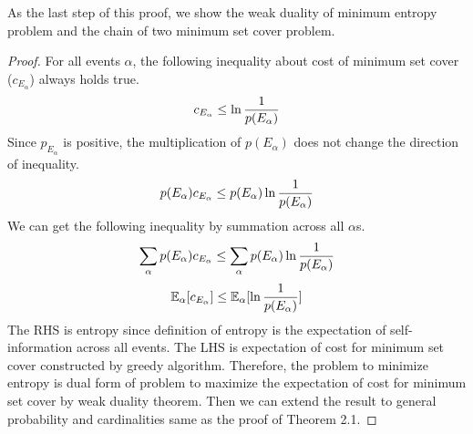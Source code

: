 As the last step of this proof, we show the weak duality of minimum entropy problem and the chain of 
two minimum set cover problem.

\begin{proof}
For all events $\alpha$, the following inequality about cost of minimum set cover 
($c_{E_\alpha}$) always holds true. 
\begin{equation}
\label{cost_up_bound_event}
c_{E_\alpha} \le \ln {1 \over p({E_\alpha})}
\end{equation}
Since $p_{E_\alpha}$ is positive, the multiplication of $p({E_{\alpha}})$ does not 
change the direction of inequality.
\begin{equation}
\label{weighted_cost_up_bound_event}
p({E_\alpha})c_{E_\alpha} \le p({E_\alpha})\ln {1 \over p({E_\alpha})} \\
\end{equation}
We can get the following inequality by summation across all $\alpha$s.
\begin{equation}
\label{cost_up_bound_event_space}
\sum_{\alpha} p({E_\alpha})c_{E_\alpha} \le \sum_{\alpha}p({E_\alpha})\ln {1 \over p({E_\alpha})} \\
\end{equation}
\begin{equation}
\label{cost_up_bound_expectation}
\mathbb{E}_{\alpha}[c_{E_\alpha}] \le \mathbb{E}_{\alpha}[\ln {1 \over p({E_\alpha})}]
\end{equation}
The RHS is entropy since definition of entropy is the expectation of self-information across all events. 
The LHS is expectation of cost for minimum set cover constructed by greedy algorithm. 
Therefore, the problem to minimize entropy is dual form of problem to maximize 
the expectation of cost for minimum set cover by weak duality theorem. 
Then we can extend the result to general probability and cardinalities same as the proof of Theorem 2.1.
\end{proof}


